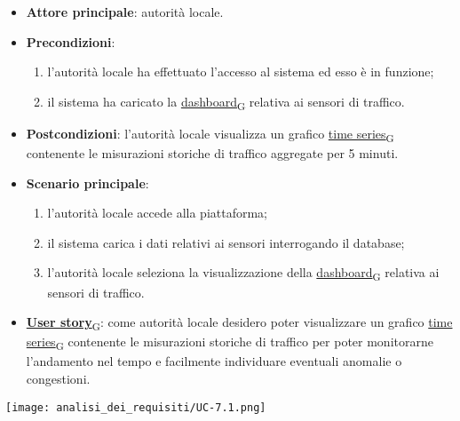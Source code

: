 \newpage

\begin{itemize}
	\item \textbf{Attore principale}: autorità locale.
	\item \textbf{Precondizioni}:
	      \begin{enumerate}
		      \item l'autorità locale ha effettuato l'accesso al sistema ed esso è in funzione;
		      \item il sistema ha caricato la \href{https://7last.github.io/docs/rtb/documentazione-interna/glossario\#dashboard}{dashboard\textsubscript{G}} relativa ai sensori di traffico.
	      \end{enumerate}
	\item \textbf{Postcondizioni}: l'autorità locale visualizza un grafico \href{https://7last.github.io/docs/rtb/documentazione-interna/glossario\#time-series}{time series\textsubscript{G}} contenente le misurazioni storiche di traffico aggregate per 5 minuti.
	\item \textbf{Scenario principale}:
	      \begin{enumerate}
		      \item l'autorità locale accede alla piattaforma;
		      \item il sistema carica i dati relativi ai sensori interrogando il database;
		      \item l'autorità locale seleziona la visualizzazione della \href{https://7last.github.io/docs/rtb/documentazione-interna/glossario\#dashboard}{dashboard\textsubscript{G}} relativa ai sensori di traffico.
	      \end{enumerate}
	\item \href{https://7last.github.io/docs/rtb/documentazione-interna/glossario\#user-story}{\textbf{User story}\textsubscript{G}}:
	      come autorità locale desidero poter visualizzare un grafico \href{https://7last.github.io/docs/rtb/documentazione-interna/glossario\#time-series}{time series\textsubscript{G}} contenente le misurazioni storiche
	      di traffico per poter monitorarne l'andamento nel tempo e facilmente individuare eventuali anomalie
	      o congestioni.
\end{itemize}
\begin{center}
	\texttt{[image: analisi\_dei\_requisiti/UC-7.1.png]}
\end{center}

